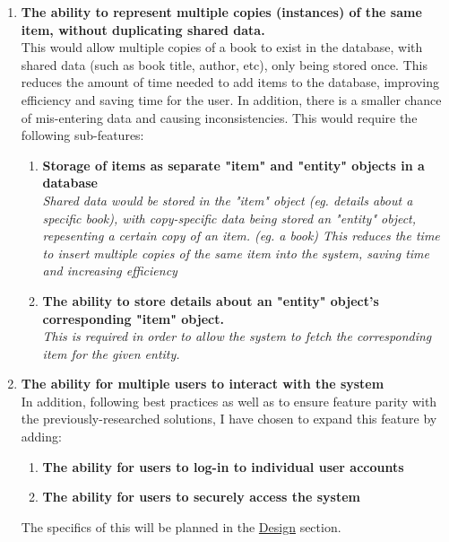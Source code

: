 \documentclass[../../../main.tex]{subfiles}
\begin{document}
\begin{enumerate}
    \item \textbf{The ability to represent multiple copies (instances) of the same item, without duplicating shared data.}\\
          This would allow multiple copies of a book to exist in the database, with shared data (such as book title, author, etc), only being stored once.
          This reduces the amount of time needed to add items to the database, improving efficiency and saving time for the user.
          In addition, there is a smaller chance of mis-entering data and causing inconsistencies.
          This would require the following sub-features:
          \begin{enumerate}
              \item \textbf{Storage of items as separate "item" and "entity" objects in a database}\\
                    \textit{Shared data would be stored in the "item" object (eg. details about
                        a specific book), with copy-specific data being stored an "entity" object,
                        repesenting a certain copy of an item. (eg. a book)
                        This reduces the time to insert multiple copies of the same item into the
                        system, saving time and increasing efficiency}
              \item \textbf{The ability to store details about an "entity" object's corresponding "item" object.}\\
                    \textit{This is required in order to allow the system to fetch the
                        corresponding item for the given entity.}
          \end{enumerate}

    \item \textbf{The ability for multiple users to interact with the system}\\
          In addition, following best practices as well as to ensure feature parity with the
          previously-researched solutions, I have chosen to expand this feature by adding:
          \begin{enumerate}
              \item \textbf{The ability for users to log-in to individual user accounts}
              \item \textbf{The ability for users to securely access the system}
          \end{enumerate}
          The specifics of this will be planned in the \underline{Design} section.


\end{enumerate}
\end{document}
